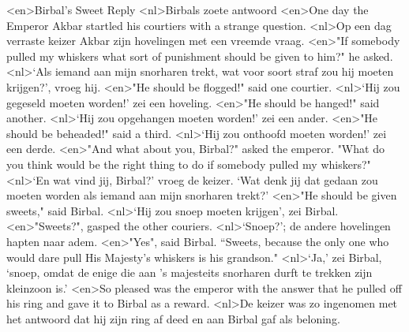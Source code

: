 <en>Birbal's Sweet Reply 
<nl>Birbals zoete antwoord
<en>One day the Emperor Akbar startled his courtiers with a strange question. 
<nl>Op een dag verraste keizer Akbar zijn hovelingen met een vreemde vraag.
<en>"If somebody pulled my whiskers what sort of punishment should be given to him?" he asked. 
<nl>`Als iemand aan mijn snorharen trekt, wat voor soort straf zou hij moeten krijgen?', vroeg hij.
<en>"He should be flogged!" said one courtier. 
<nl>`Hij zou gegeseld moeten worden!' zei een hoveling.
<en>"He should be hanged!" said another. 
<nl>`Hij zou opgehangen moeten worden!' zei een ander.
<en>"He should be beheaded!" said a third. 
<nl>`Hij zou onthoofd moeten worden!' zei een derde.
<en>"And what about you, Birbal?" asked the emperor. "What do you think would be the right thing to do if somebody pulled my whiskers?" 
<nl>`En wat vind jij, Birbal?' vroeg de keizer. `Wat denk jij dat gedaan zou moeten worden als iemand aan mijn snorharen trekt?'
<en>"He should be given sweets," said Birbal. 
<nl>`Hij zou snoep moeten krijgen', zei Birbal.
<en>"Sweets?", gasped the other couriers. 
<nl>`Snoep?'; de andere hovelingen hapten naar adem.
<en>"Yes", said Birbal. “Sweets, because the only one who would dare pull His Majesty's whiskers is his grandson." 
<nl>`Ja,' zei Birbal, `snoep, omdat de enige die aan 's majesteits snorharen durft te trekken zijn kleinzoon is.'
<en>So pleased was the emperor with the answer that he pulled off his ring and gave it to Birbal as a reward. 
<nl>De keizer was zo ingenomen met het antwoord dat hij zijn ring af deed en  aan Birbal gaf als beloning.
